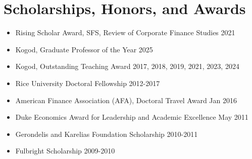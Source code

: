 \documentclass{article}[12]
\begin{document}
\section{Scholarships, Honors, and Awards}

\begin{itemize}[itemsep=0.05em]
    \item Rising Scholar Award, SFS, Review of Corporate Finance Studies \hfill 2021
    \item Kogod, Graduate Professor of the Year \hfill 2025
    \item Kogod, Outstanding Teaching Award \hfill 2017, 2018, 2019, 2021, 2023, 2024
    \item Rice University Doctoral Fellowship \hfill 2012-2017
    \item American Finance Association (AFA), Doctoral Travel Award \hfill Jan 2016
    \item Duke Economics Award for Leadership and Academic Excellence \hfill May 2011
    \item Gerondelis and Karelias Foundation Scholarship \hfill 2010-2011
    \item Fulbright Scholarship \hfill 2009-2010
\end{itemize}
\end{document}
